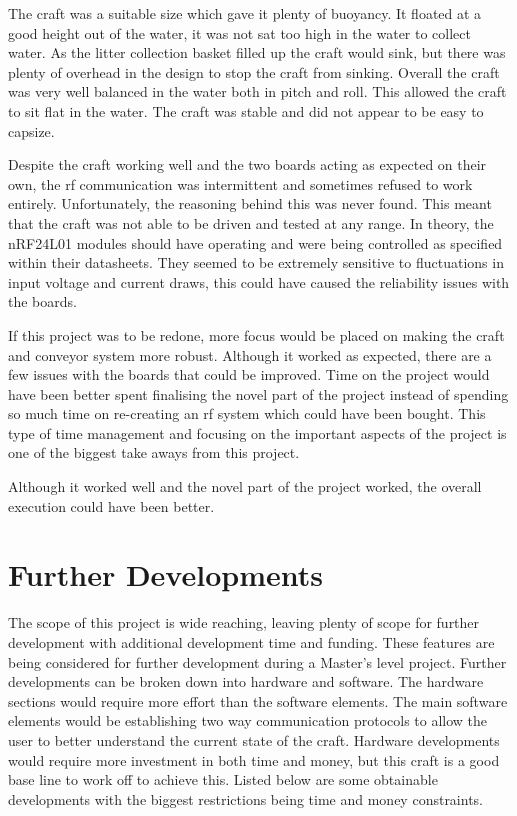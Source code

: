 \documentclass [12pt]{article}
\begin{document}
The craft was a suitable size which gave it plenty of buoyancy. It floated at a good height out of the water, it was not sat too high in the water to collect water. As the litter collection basket filled up the craft would sink, but there was plenty of overhead in the design to stop the craft from sinking. Overall the craft was very well balanced in the water both in pitch and roll. This allowed the craft to sit flat in the water. The craft was stable and did not appear to be easy to capsize.  

Despite the craft working well and the two boards acting as expected on their own, the \gls{rf} communication was intermittent and sometimes refused to work entirely. Unfortunately, the reasoning behind this was never found. This meant that the craft was not able to be driven and tested at any range. In theory, the nRF24L01 modules should have operating and were being controlled as specified within their datasheets. They seemed to be extremely sensitive to fluctuations in input voltage and current draws, this could have caused the reliability issues with the boards. 

If this project was to be redone, more focus would be placed on making the craft and conveyor system more robust. Although it worked as expected, there are a few issues with the boards that could be improved. Time on the project would have been better spent finalising the novel part of the project instead of spending so much time on re-creating an \gls{rf} system which could have been bought. This type of time management and focusing on the important aspects of the project is one of the biggest take aways from this project. 

Although it worked well and the novel part of the project worked, the overall execution could have been better. 

\section{Further Developments}
The scope of this project is wide reaching, leaving plenty of scope for further development with additional development time and funding. These features are being considered for further development during a Master's level project. Further developments can be broken down into hardware and software. The hardware sections would require more effort than the software elements. The main software elements would be establishing two way communication protocols to allow the user to better understand the current state of the craft. Hardware developments would require more investment in both time and money, but this craft is a good base line to work off to achieve this. Listed below are some obtainable developments with the biggest restrictions being time and money constraints.
\end{document}
